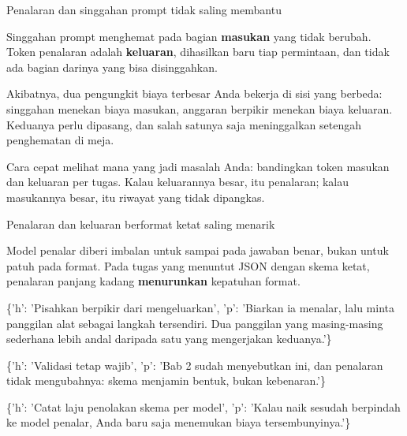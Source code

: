 \documentclass[aspectratio=169,11pt,t]{beamer}
\begin{document}
\begin{frame}[shrink=25]{Penalaran dan singgahan prompt tidak saling membantu}
{\fontsize{9.4}{12.6}\selectfont\color{fg2}Singgahan prompt menghemat pada bagian \textbf{masukan} yang tidak berubah. Token penalaran adalah \textbf{keluaran}, dihasilkan baru tiap permintaan, dan tidak ada bagian darinya yang bisa disinggahkan.\par}\vskip 4pt
{\fontsize{9.4}{12.6}\selectfont\color{fg2}Akibatnya, dua pengungkit biaya terbesar Anda bekerja di sisi yang berbeda: singgahan menekan biaya masukan, anggaran berpikir menekan biaya keluaran. Keduanya perlu dipasang, dan salah satunya saja meninggalkan setengah penghematan di meja.\par}\vskip 4pt
\begin{iband}[signal]
Cara cepat melihat mana yang jadi masalah Anda: bandingkan token masukan dan keluaran per tugas. Kalau keluarannya besar, itu penalaran; kalau masukannya besar, itu riwayat yang tidak dipangkas.
\end{iband}
\end{frame}

\begin{frame}[shrink=25]{Penalaran dan keluaran berformat ketat saling menarik}
{\fontsize{9.4}{12.6}\selectfont\color{fg2}Model penalar diberi imbalan untuk sampai pada jawaban benar, bukan untuk patuh pada format. Pada tugas yang menuntut JSON dengan skema ketat, penalaran panjang kadang \textbf{menurunkan} kepatuhan format.\par}\vskip 4pt
\begin{isteps}
\item \{'h': 'Pisahkan berpikir dari mengeluarkan', 'p': 'Biarkan ia menalar, lalu minta panggilan alat sebagai langkah tersendiri. Dua panggilan yang masing-masing sederhana lebih andal daripada satu yang mengerjakan keduanya.'\}
\item \{'h': 'Validasi tetap wajib', 'p': 'Bab 2 sudah menyebutkan ini, dan penalaran tidak mengubahnya: skema menjamin bentuk, bukan kebenaran.'\}
\item \{'h': 'Catat laju penolakan skema per model', 'p': 'Kalau naik sesudah berpindah ke model penalar, Anda baru saja menemukan biaya tersembunyinya.'\}
\end{isteps}
\end{frame}
\end{document}
